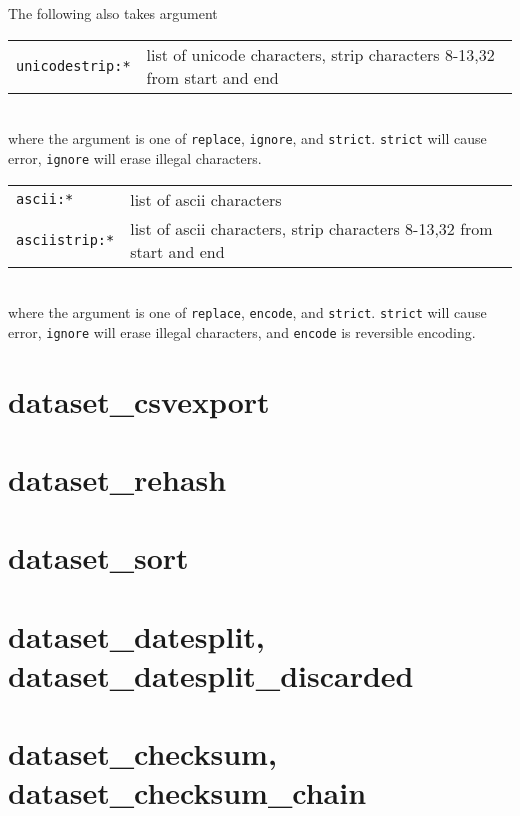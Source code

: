 \noindent The following also takes argument\\

\begin{tabular}{ll}
  \texttt{unicodestrip:*}  & list of unicode characters, strip characters 8-13,32 from start and end\\
\end{tabular}\\

\noindent where the argument is one of \texttt{replace}, \texttt{ignore}, and \texttt{strict}.
\texttt{strict} will cause error, \texttt{ignore} will erase illegal characters.\\

\begin{tabular}{ll}
  \texttt{ascii:*}      & list of ascii characters\\
  \texttt{asciistrip:*} & list of ascii characters, strip characters 8-13,32 from start and end\\
\end{tabular}\\

\noindent where the argument is one of \texttt{replace}, \texttt{encode}, and \texttt{strict}.
\texttt{strict} will cause error, \texttt{ignore} will erase illegal characters,
and \texttt{encode} is reversible encoding.


\clearpage
\section{dataset\_csvexport}

\clearpage
\section{dataset\_rehash}

\clearpage
\section{dataset\_sort}

\clearpage
\section{dataset\_datesplit, dataset\_datesplit\_discarded}

\clearpage
\section{dataset\_checksum, dataset\_checksum\_chain}


